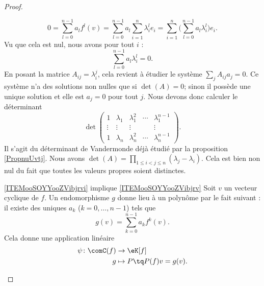 \begin{proof}
\begin{subproof}
            \begin{equation}
                    0=\sum_{l=0}^{n-1}a_lf^l(v)=\sum_{l=0}^{n-1}a_l\sum_{i=1}^n\lambda_i^le_i=\sum_{i=1}^n\Big( \sum_{l=0}^{n-1}a_l\lambda_i^l \Big)e_i.
            \end{equation}
            Vu que cela est nul, nous avons pour tout \( i\) :
            \begin{equation}
                \sum_{l=0}^{n-1}a_l\lambda_i^l=0.
            \end{equation}
            En posant la matrice \( A_{ij}=\lambda_i^j\), cela revient à étudier le système \( \sum_j A_{ij}a_j=0\). Ce système n'a des solutions non nulles que si \( \det(A)= 0\); sinon il possède une unique solution et elle est \( a_j=0\) pour tout \( j\). Nous devons donc calculer le déterminant
            \begin{equation}
                \det\begin{pmatrix}
                    1&\lambda_1&\lambda_1^2&\cdots&\lambda_1^{n-1}\\  
                    \vdots&\vdots&\vdots&&\vdots\\  
                    1&\lambda_n&\lambda_n^2&\cdots&\lambda_n^{n-1}  
                \end{pmatrix}.
            \end{equation}
            Il s'agit du déterminant de Vandermonde déjà étudié par la proposition \ref{PropnuUvtj}. Nous avons \( \det(A)=\prod_{1\leq i<j\leq n}(\lambda_j-\lambda_i)\). Cela est bien non nul du fait que toutes les valeurs propres soient distinctes.
        \item[\ref{ITEMooSOYYooZVibjrvi} implique \ref{ITEMooSOYYooZVibjrv}]
            Soit \( v\) un vecteur cyclique de \( f\). Un endomorphisme \( g\) donne lieu à un polynôme par le fait suivant : il existe des uniques \( a_k\) (\( k=0,\ldots, n-1\)) tels que
            \begin{equation}
                g(v)=\sum_{k=0}^{n-1}a_kf^k(v).
            \end{equation}
            Cela donne une application linéaire
            \begin{equation}
                \begin{aligned}
                    \psi\colon \comC(f)&\to \eK[f] \\
                    g&\mapsto P\tq P(f)v=g(v). 
                \end{aligned}
            \end{equation}

\end{subproof}
\end{proof}
